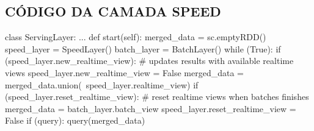 \begin{apendicesenv}
\section{CÓDIGO DA CAMADA SPEED}
\begin{python}
class ServingLayer:
    ...
    def start(self):
        merged_data = sc.emptyRDD()
        speed_layer = SpeedLayer()
        batch_layer = BatchLayer()
        while (True):
            if (speed_layer.new_realtime_view):
                # updates results with available realtime views
                speed_layer.new_realtime_view = False
                merged_data = merged_data.union(\
                    speed_layer.realtime_view)
            if (speed_layer.reset_realtime_view):
                # reset realtime views when batches finishes
                merged_data = batch_layer.batch_view
                speed_layer.reset_realtime_view = False
            if (query):
                query(merged_data)
\end{python}

\end{apendicesenv}

